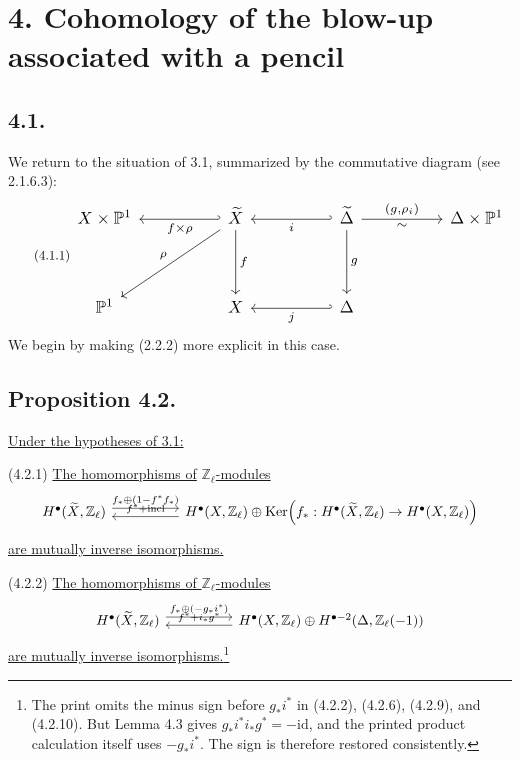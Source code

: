 \section*{4. Cohomology of the blow-up associated with a pencil}

\subsection*{4.1.}
We return to the situation of 3.1, summarized by the commutative diagram
(see 2.1.6.3):
\begin{equation}\tag{4.1.1}
\resizebox{\textwidth}{!}{%
\begin{tikzcd}[ampersand replacement=\&,row sep=huge,column sep=huge]
X\times\mathbb P^1
  \& \widetilde X
      \arrow[l,hook',"f\times\rho"]
      \arrow[d,"f"]
      \arrow[dl,"\rho"']
  \& \widetilde\Delta
      \arrow[l,hook',"i"]
      \arrow[d,"g"]
      \arrow[r,"{(g,\rho_i)}","\sim"']
  \& \Delta\times\mathbb P^1 \\
\mathbb P^1 \& X \& \Delta\arrow[l,hook',"j"] \& {}
\end{tikzcd}}
\end{equation}
We begin by making (2.2.2) more explicit in this case.

\subsection*{Proposition 4.2.}
\underline{Under the hypotheses of 3.1:}

\smallskip
\noindent
\textup{(4.2.1)} \underline{The homomorphisms of} $\mathbb Z_\ell$\underline{-modules}
\[
\begin{tikzcd}[column sep=huge]
H^\bullet(\widetilde X,\mathbb Z_\ell)
  \arrow[r,shift left=.7ex,"f_*\oplus(1-f^*f_*)"]
& H^\bullet(X,\mathbb Z_\ell)\oplus
   \operatorname{Ker}\!\left(f_*:H^\bullet(\widetilde X,\mathbb Z_\ell)
       \to H^\bullet(X,\mathbb Z_\ell)\right)
  \arrow[l,shift left=.7ex,"f^*+\operatorname{incl}"']
\end{tikzcd}
\]
\underline{are mutually inverse isomorphisms.}

\smallskip
\noindent
\textup{(4.2.2)} \underline{The homomorphisms of $\mathbb Z_\ell$-modules}
\[
\begin{tikzcd}[column sep=huge]
H^\bullet(\widetilde X,\mathbb Z_\ell)
  \arrow[r,shift left=.7ex,"f_*\oplus(-g_*i^*)"]
& H^\bullet(X,\mathbb Z_\ell)\oplus
   H^{\bullet-2}(\Delta,\mathbb Z_\ell(-1))
  \arrow[l,shift left=.7ex,"f^*+i_*g^*"']
\end{tikzcd}
\]
\underline{are mutually inverse isomorphisms.}\footnote{The print omits
the minus sign before $g_*i^*$ in (4.2.2), (4.2.6), (4.2.9), and
(4.2.10).  But Lemma 4.3 gives
$g_*i^*i_*g^*=-\mathrm{id}$, and the printed product calculation itself
uses $-g_*i^*$.  The sign is therefore restored consistently.}

